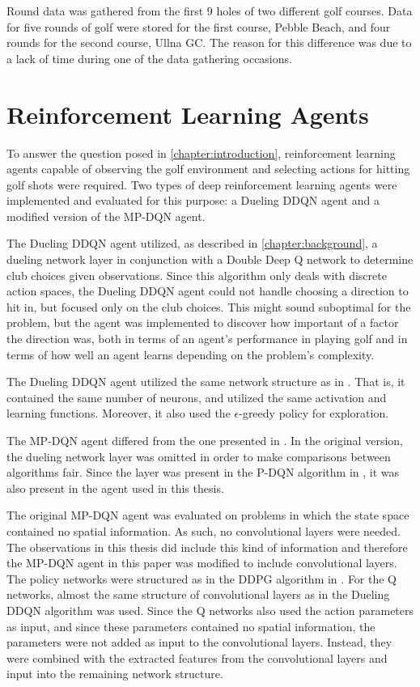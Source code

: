 \documentclass{kththesis}
\begin{document}
Round data was gathered from the first 9 holes of two different golf courses. Data for five rounds of golf were stored for the first course, Pebble Beach, and four rounds for the second course, Ullna GC. The reason for this difference was due to a lack of time during one of the data gathering occasions.

\section{Reinforcement Learning Agents}
To answer the question posed in \autoref{chapter:introduction}, reinforcement learning agents capable of observing the golf environment and selecting actions for hitting golf shots were required. Two types of deep reinforcement learning agents were implemented and evaluated for this purpose: a Dueling DDQN agent and a modified version of the MP-DQN agent.

The Dueling DDQN agent utilized, as described in \autoref{chapter:background}, a dueling network layer in conjunction with a Double Deep Q network to determine club choices given observations. Since this algorithm only deals with discrete action spaces, the Dueling DDQN agent could not handle choosing a direction to hit in, but focused only on the club choices. This might sound suboptimal for the problem, but the agent was implemented to discover how important of a factor the direction was, both in terms of an agent's performance in playing golf and in terms of how well an agent learns depending on the problem's complexity. 

The Dueling DDQN agent utilized the same network structure as in \parencite{wang2015dueling}. That is, it contained the same number of neurons, and utilized the same activation and learning functions. Moreover, it also used the $\epsilon$-greedy policy for exploration.

The MP-DQN agent differed from the one presented in \parencite{bester2019mpdqn}. In the original version, the dueling network layer was omitted in order to make comparisons between algorithms fair. Since the layer was present in the P-DQN algorithm in \parencite{xiong2018parametrized}, it was also present in the agent used in this thesis. 

The original MP-DQN agent was evaluated on problems in which the state space contained no spatial information. As such, no convolutional layers were needed. The observations in this thesis did include this kind of information and therefore the MP-DQN agent in this paper was modified to include convolutional layers. The policy networks were structured as in the DDPG algorithm in \parencite{lillicrap2015continuous}. For the Q networks, almost the same structure of convolutional layers as in the Dueling DDQN algorithm was used. Since the Q networks also used the action parameters as input, and since these parameters contained no spatial information, the parameters were not added as input to the convolutional layers. Instead, they were combined with the extracted features from the convolutional layers and input into the remaining network structure.
\end{document}
